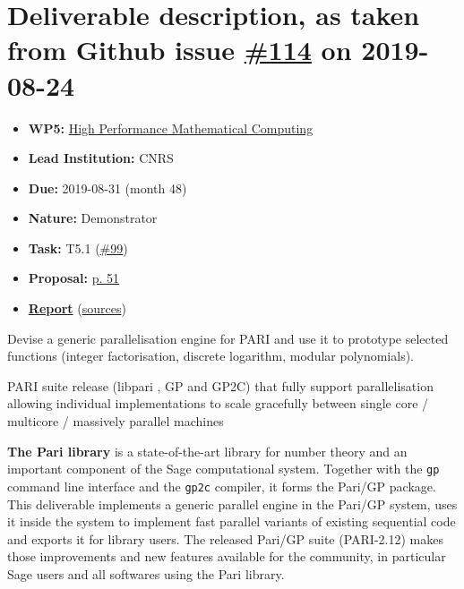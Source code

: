 \hypertarget{deliverable-description-as-taken-from-github-issue-114-on-2019-08-24}{%
\section*{\texorpdfstring{Deliverable description, as taken from Github
issue
\href{https://github.com/OpenDreamKit/OpenDreamKit/issues/114}{\#114} on
2019-08-24}{Deliverable description, as taken from Github issue \#114 on 2019-08-24}}\label{deliverable-description-as-taken-from-github-issue-114-on-2019-08-24}}

\begin{itemize}
\tightlist
\item
  \textbf{WP5:}
  \href{https://github.com/OpenDreamKit/OpenDreamKit/tree/master/WP5}{High
  Performance Mathematical Computing}
\item
  \textbf{Lead Institution:} CNRS
\item
  \textbf{Due:} 2019-08-31 (month 48)
\item
  \textbf{Nature:} Demonstrator
\item
  \textbf{Task:} T5.1
  (\href{https://github.com/OpenDreamKit/OpenDreamKit/issues/99}{\#99})
\item
  \textbf{Proposal:}
  \href{https://github.com/OpenDreamKit/OpenDreamKit/raw/master/Proposal/proposal-www.pdf}{p.
  51}
\item
  \textbf{\href{https://github.com/OpenDreamKit/OpenDreamKit/raw/master/WP5/D5.16/report-final.pdf}{Report}}
  (\href{https://github.com/OpenDreamKit/OpenDreamKit/raw/master/WP5/D5.16/}{sources})
\end{itemize}

Devise a generic parallelisation engine for PARI and use it to prototype
selected functions (integer factorisation, discrete logarithm, modular
polynomials).

PARI suite release (libpari , GP and GP2C) that fully support
parallelisation allowing individual implementations to scale gracefully
between single core / multicore / massively parallel machines

\textbf{The Pari library} is a state-of-the-art library for number
theory and an important component of the Sage computational system.
Together with the \texttt{gp} command line interface and the
\texttt{gp2c} compiler, it forms the Pari/GP package. This deliverable
implements a generic parallel engine in the Pari/GP system, uses it
inside the system to implement fast parallel variants of existing
sequential code and exports it for library users. The released Pari/GP
suite (PARI-2.12) makes those improvements and new features available
for the community, in particular Sage users and all softwares using the
Pari library.

